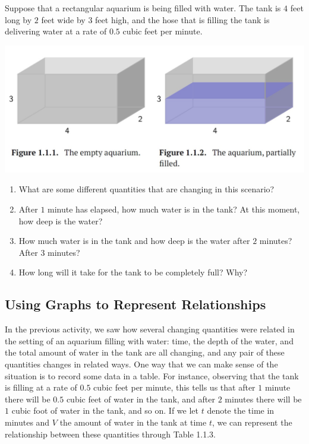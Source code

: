 \documentclass{ximera}
\begin{document}
\begin{exploration}
Suppose that a rectangular aquarium is being filled with water.  The tank is \(4\) feet long by \(2\) feet wide by \(3\) feet high, and the hose that is filling the tank is delivering water at a rate of \(0.5\) cubic feet per minute.

\includegraphics[width=\textwidth]{APCfigure1-1-1.jpg}

\begin{enumerate}[label=\alph*.]
\item What are some different quantities that are changing in this scenario?%
\item After \(1\) minute has elapsed, how much water is in the tank?  At this moment, how deep is the water?%
\item How much water is in the tank and how deep is the water after \(2\) minutes?  After \(3\) minutes?%
\item How long will it take for the tank to be completely full?  Why?%
\end{enumerate}
\end{exploration}



\subsection{Using Graphs to Represent Relationships}
In the previous activity, we saw how several changing quantities were related in the setting of an aquarium filling with water: time, the depth of the water, and the total amount of water in the tank are all changing, and any pair of these quantities changes in related ways.  One way that we can make sense of the situation is to record some data in a table.  For instance, observing that the tank is filling at a rate of \(0.5\) cubic feet per minute, this tells us that after \(1\) minute there will be \(0.5\) cubic feet of water in the tank, and after \(2\) minutes there will be \(1\) cubic foot of water in the tank, and so on.  If we let \(t\) denote the time in minutes and \(V\) the amount of water in the tank at time \(t\), we can represent the relationship between these quantities through Table 1.1.3.%
\end{document}
